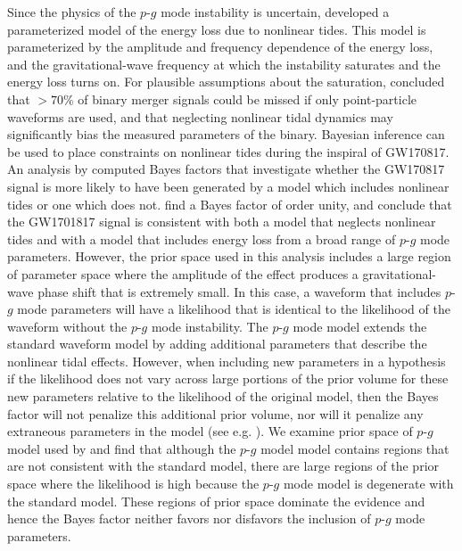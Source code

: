 Since the physics of the $p$-$g$ mode instability is uncertain, \cite{Essick:2016tkn} developed a parameterized model of the energy loss due to nonlinear tides. This model is parameterized by the amplitude and frequency dependence of the energy loss, and the gravitational-wave frequency at which the instability saturates and the energy loss turns on. For plausible assumptions about the saturation, \cite{Essick:2016tkn} concluded that $> 70\%$ of binary merger signals could be missed if only point-particle waveforms are used, and that neglecting nonlinear tidal dynamics may significantly bias the measured parameters of the binary. Bayesian inference can be used to place constraints on nonlinear tides during the inspiral of GW170817. An analysis by \cite{abbott2019constraining} computed Bayes factors that investigate whether the GW170817 signal is more likely to have been generated by a model which includes nonlinear tides or one which does not. \cite{abbott2019constraining} find a Bayes factor of order unity, and conclude that the GW1701817 signal is consistent with both a model that neglects nonlinear tides and with a model that includes energy loss from a broad range of $p$-$g$ mode parameters. However, the prior space used in this analysis includes a large region of  parameter space where the amplitude of the effect produces a gravitational-wave phase shift that is extremely small. In this case, a waveform that includes $p$-$g$ mode parameters will have a likelihood that is identical to the likelihood of the waveform without the $p$-$g$ mode instability. The $p$-$g$ mode model extends the standard waveform model by adding additional parameters that describe the nonlinear tidal effects. However, when including new parameters in a hypothesis if the likelihood does not vary across large portions of the prior volume for these new parameters relative to the likelihood of the original model, then the Bayes factor will not penalize this additional prior volume, nor will it penalize any extraneous parameters in the model (see e.g. \cite{kass1995bayes,hobson2010bayesian}). We examine prior space of $p$-$g$ model used by \cite{abbott2019constraining} and find that although the $p$-$g$ model model contains regions that are not consistent with the standard model, there are large regions of the prior space where the likelihood is high because the $p$-$g$ mode model is degenerate with the standard model. These regions of prior space dominate the evidence and hence the Bayes factor neither favors nor disfavors the inclusion of $p$-$g$ mode parameters.

